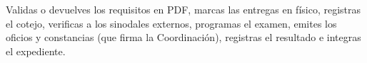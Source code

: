 \documentclass[11pt,a4paper]{article}
\begin{document}
{\small\tableofcontents}
\newpage
\begin{quevasahacer}
Validas o devuelves los requisitos en PDF, marcas las entregas en físico, registras el cotejo, verificas a los sinodales externos, programas el examen, emites los oficios y constancias (que firma la Coordinación), registras el resultado e integras el expediente.
\end{quevasahacer}



\end{document}
